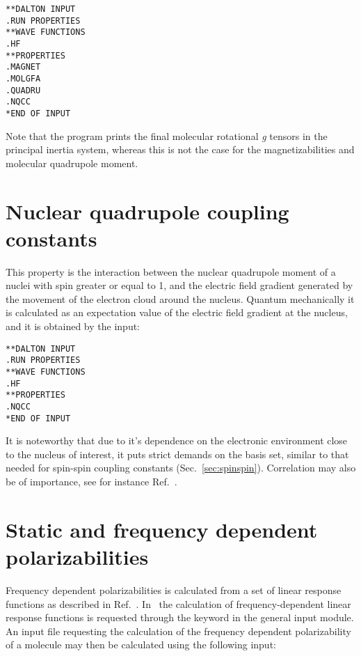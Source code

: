 \begin{verbatim}
**DALTON INPUT
.RUN PROPERTIES
**WAVE FUNCTIONS
.HF
**PROPERTIES
.MAGNET
.MOLGFA
.QUADRU
.NQCC
*END OF INPUT
\end{verbatim}

Note that the program prints the final molecular rotational {\em g}
tensors in the
principal inertia system, whereas this is not the case for the
magnetizabilities and molecular quadrupole moment.

\section{Nuclear quadrupole coupling constants}

This property is the interaction between the nuclear quadrupole
moment
of a nuclei with spin greater or equal to 1, and the electric field gradient
generated by the movement of the electron cloud around the nucleus.
Quantum mechanically it is calculated as an expectation value of the electric
field gradient  at the nucleus, and it is obtained by the input:

\begin{verbatim}
**DALTON INPUT
.RUN PROPERTIES
**WAVE FUNCTIONS
.HF
**PROPERTIES
.NQCC
*END OF INPUT
\end{verbatim}

It is noteworthy that due to it's dependence on the
electronic environment close to the nucleus of interest, it puts strict
demands on the basis set, similar to that needed for spin-spin
coupling
constants (Sec.~\ref{sec:spinspin}). Correlation may also be of
importance, see for instance Ref.~\cite{mjssocpjthkrcpl243}.

\section{Static and frequency dependent
polarizabilities}\label{sec:polari}

Frequency dependent polarizabilities is
calculated from a set of linear
response functions as described in
Ref.~\cite{jopjjcp82}. In \aba\ the
calculation of frequency-dependent linear response functions is
requested through the keyword  in the general input
module. An input file requesting the calculation of the frequency
dependent polarizability of a molecule may then be calculated using
the following input:

